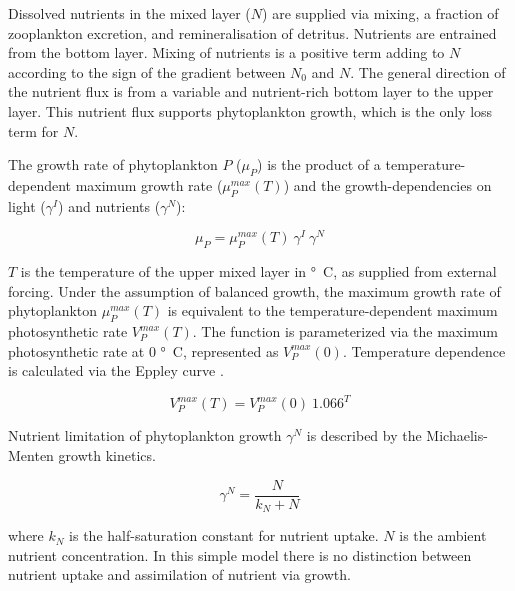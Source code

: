 \documentclass[journal abbreviation, manuscript]{copernicus}
\begin{document}
Dissolved nutrients in the mixed layer ($N$) are supplied via mixing, a fraction of zooplankton excretion, and remineralisation of detritus.
Nutrients are entrained from the bottom layer. Mixing of nutrients is a positive term adding to $N$ according to the sign of the gradient between $N_0$ and $N$. The general direction of the nutrient flux is from a variable and nutrient-rich bottom layer to the upper layer. This nutrient flux supports phytoplankton growth, which is the only loss term for $N$.

The growth rate of phytoplankton $P$ ($\mu_{P}$) is the product of a temperature-dependent maximum growth rate ($\mu_P^{max}(T)$) and the growth-dependencies on light ($\gamma^{I}$) and nutrients ($\gamma^{N}$): 

\begin{equation}
    \mu_{P} = \mu_P^{max}(T) \ \gamma^{I} \ \gamma^{N}
\end{equation}

$T$ is the temperature of the upper mixed layer in \unit{\degree C}, as supplied from external forcing. Under the assumption of balanced growth, the maximum growth rate of phytoplankton $\mu_P^{max}(T)$ is equivalent to the temperature-dependent maximum photosynthetic rate $V_P^{max}(T)$. The function is parameterized via the maximum photosynthetic rate at 0 \unit{\degree C}, represented as $V_P^{max}(0)$. Temperature dependence is calculated via the Eppley curve \citep{Eppley1972TemperatureSea}.

\begin{equation}
    V_P^{max}(T) = V_P^{max}(0) \ 1.066^T
\end{equation}

Nutrient limitation of phytoplankton growth $\gamma^N$ is described by the Michaelis-Menten growth kinetics.

\begin{equation}
    \gamma^N = \frac{N}{k_N + N}
\end{equation}

where $k_N$ is the half-saturation constant for nutrient uptake. $N$ is the ambient nutrient concentration. In this simple model there is no distinction between nutrient uptake and assimilation of nutrient via growth.
\end{document}
